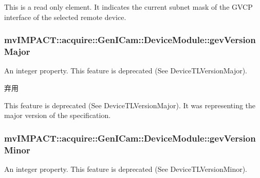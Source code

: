 This is a read only element. It indicates the current subnet mask of the G\+V\+C\+P interface of the selected remote device. \hypertarget{classmv_i_m_p_a_c_t_1_1acquire_1_1_gen_i_cam_1_1_device_module_a6c6ae00a97052ba073dc23b69b02936c}{
\subsubsection[{gev\+Version\+Major}]{ mv\+I\+M\+P\+A\+C\+T\+::acquire\+::\+Gen\+I\+Cam\+::\+Device\+Module\+::gev\+Version\+Major}}\label{classmv_i_m_p_a_c_t_1_1acquire_1_1_gen_i_cam_1_1_device_module_a6c6ae00a97052ba073dc23b69b02936c}


An integer property. This feature is deprecated (See Device\+T\+L\+Version\+Major). 

\begin{DoxyRefDesc}{弃用}
\item[\hyperlink{deprecated__deprecated000100}{弃用}]This feature is deprecated (See Device\+T\+L\+Version\+Major). It was representing the major version of the specification. \end{DoxyRefDesc}
\hypertarget{classmv_i_m_p_a_c_t_1_1acquire_1_1_gen_i_cam_1_1_device_module_afaf53a88b30e32fc35ed8f68ddbd3b46}{
\subsubsection[{gev\+Version\+Minor}]{ mv\+I\+M\+P\+A\+C\+T\+::acquire\+::\+Gen\+I\+Cam\+::\+Device\+Module\+::gev\+Version\+Minor}}\label{classmv_i_m_p_a_c_t_1_1acquire_1_1_gen_i_cam_1_1_device_module_afaf53a88b30e32fc35ed8f68ddbd3b46}


An integer property. This feature is deprecated (See Device\+T\+L\+Version\+Minor). 

